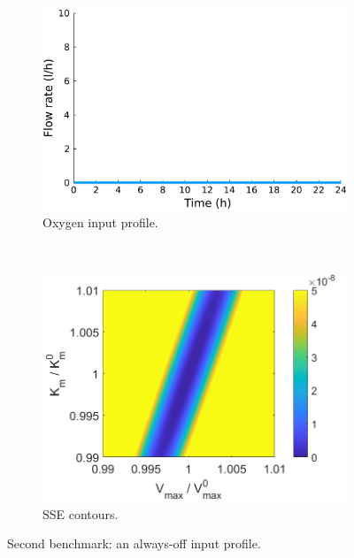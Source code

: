 \begin{figure}[H]
	\centering
	\begin{subfigure}[b]{0.45\textwidth}
		\includegraphics[width=\textwidth]{figure/paper 1/extra3}
		\caption{Oxygen input profile.}
		\label{inputcompareLiterature}
	\end{subfigure}
	~ %
	\begin{subfigure}[b]{0.45\textwidth}
		\includegraphics[width=\textwidth]{figure/paper 1/compareLiterature.png}
		\caption{SSE contours.}
		\label{SSEcompareLiterature}
	\end{subfigure}
	\caption{Second benchmark: an always-off input profile.}
	\label{compareLiterature}
\end{figure}
